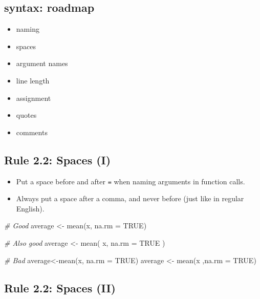 \documentclass[
  letterpaper,
  DIV=11,
  numbers=noendperiod]{scrreprt}
\newenvironment{Shaded}{}{}
\newcommand{\AttributeTok}[1]{\textcolor[rgb]{0.49,0.56,0.16}{#1}}
\newcommand{\CommentTok}[1]{\textcolor[rgb]{0.38,0.63,0.69}{\textit{#1}}}
\newcommand{\ConstantTok}[1]{\textcolor[rgb]{0.53,0.00,0.00}{#1}}
\newcommand{\FunctionTok}[1]{\textcolor[rgb]{0.02,0.16,0.49}{#1}}
\newcommand{\NormalTok}[1]{#1}
\newcommand{\OtherTok}[1]{\textcolor[rgb]{0.00,0.44,0.13}{#1}}
\providecommand{\tightlist}{%
  \setlength{\itemsep}{0pt}\setlength{\parskip}{0pt}}\usepackage{longtable,booktabs,array}
\begin{document}
\subsection{syntax: roadmap}\label{syntax-roadmap}

\begin{itemize}
\tightlist
\item
  naming
\item
  spaces
\item
  argument names
\item
  line length
\item
  assignment
\item
  quotes
\item
  comments
\end{itemize}

\subsection{Rule 2.2: Spaces (I)}\label{rule-2.2-spaces-i}

\begin{itemize}
\tightlist
\item
  Put a space before and after \texttt{=} when naming arguments in
  function calls.
\item
  Always put a space after a comma, and never before (just like in
  regular English).
\end{itemize}

\begin{Shaded}
\begin{Highlighting}[]
\CommentTok{\# Good}
\NormalTok{average }\OtherTok{\textless{}{-}} \FunctionTok{mean}\NormalTok{(x, }\AttributeTok{na.rm =} \ConstantTok{TRUE}\NormalTok{)}

\CommentTok{\# Also good}
\NormalTok{average }\OtherTok{\textless{}{-}} \FunctionTok{mean}\NormalTok{( x, }\AttributeTok{na.rm =} \ConstantTok{TRUE}\NormalTok{ )}

\CommentTok{\# Bad}
\NormalTok{average}\OtherTok{\textless{}{-}}\FunctionTok{mean}\NormalTok{(x, }\AttributeTok{na.rm =} \ConstantTok{TRUE}\NormalTok{)}
\NormalTok{average }\OtherTok{\textless{}{-}} \FunctionTok{mean}\NormalTok{(x ,}\AttributeTok{na.rm =} \ConstantTok{TRUE}\NormalTok{)}
\end{Highlighting}
\end{Shaded}

\subsection{Rule 2.2: Spaces (II)}\label{rule-2.2-spaces-ii}
\end{document}
